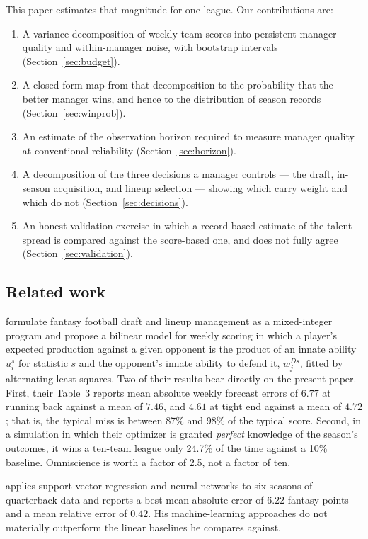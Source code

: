 \documentclass[11pt]{article}
\begin{document}
This paper estimates that magnitude for one league. Our contributions are:

\begin{enumerate}
\item A variance decomposition of weekly team scores into persistent manager
quality and within-manager noise, with bootstrap intervals
(Section~\ref{sec:budget}).
\item A closed-form map from that decomposition to the probability that the
better manager wins, and hence to the distribution of season records
(Section~\ref{sec:winprob}).
\item An estimate of the observation horizon required to measure manager quality
at conventional reliability (Section~\ref{sec:horizon}).
\item A decomposition of the three decisions a manager controls --- the draft,
in-season acquisition, and lineup selection --- showing which carry weight and
which do not (Section~\ref{sec:decisions}).
\item An honest validation exercise in which a record-based estimate of the
talent spread is compared against the score-based one, and does not fully agree
(Section~\ref{sec:validation}).
\end{enumerate}

\subsection*{Related work}

\citet{beckersun2016} formulate fantasy football draft and lineup management as
a mixed-integer program and propose a bilinear model for weekly scoring in which
a player's expected production against a given opponent is the product of an
innate ability $u^s_i$ for statistic $s$ and the opponent's innate ability to
defend it, $w^{Ds}_j$, fitted by alternating least squares. Two of their results
bear directly on the present paper. First, their Table~3 reports mean absolute
weekly forecast errors of $6.77$ at running back against a mean of $7.46$, and
$4.61$ at tight end against a mean of $4.72$; that is, the typical miss is
between 87\% and 98\% of the typical score. Second, in a simulation in which
their optimizer is granted \emph{perfect} knowledge of the season's outcomes, it
wins a ten-team league only 24.7\% of the time against a 10\% baseline.
Omniscience is worth a factor of 2.5, not a factor of ten.

\citet{lutz2015} applies support vector regression and neural networks to six
seasons of quarterback data and reports a best mean absolute error of $6.22$
fantasy points and a mean relative error of $0.42$. His machine-learning
approaches do not materially outperform the linear baselines he compares
against.
\end{document}
